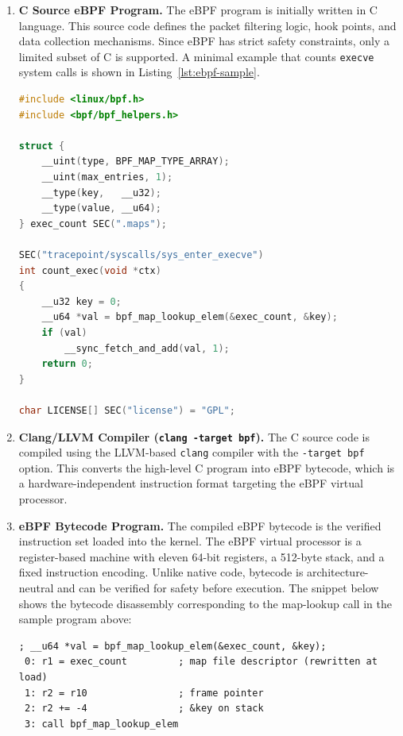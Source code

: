 \documentclass{mnitjaipur}
\begin{document}
\begin{enumerate}

\item \textbf{C Source eBPF Program.}
The eBPF program is initially written in C language. This source code defines the packet filtering logic, hook points, and data collection mechanisms. Since eBPF has strict safety constraints, only a limited subset of C is supported. A minimal example that counts \texttt{execve} system calls is shown in Listing~\ref{lst:ebpf-sample}.

\begin{lstlisting}[language=C,caption={Minimal eBPF C program: counting execve calls},label={lst:ebpf-sample}]
#include <linux/bpf.h>
#include <bpf/bpf_helpers.h>

struct {
    __uint(type, BPF_MAP_TYPE_ARRAY);
    __uint(max_entries, 1);
    __type(key,   __u32);
    __type(value, __u64);
} exec_count SEC(".maps");

SEC("tracepoint/syscalls/sys_enter_execve")
int count_exec(void *ctx)
{
    __u32 key = 0;
    __u64 *val = bpf_map_lookup_elem(&exec_count, &key);
    if (val)
        __sync_fetch_and_add(val, 1);
    return 0;
}

char LICENSE[] SEC("license") = "GPL";
\end{lstlisting}

\item \textbf{Clang/LLVM Compiler (\texttt{clang -target bpf}).}
The C source code is compiled using the LLVM-based \texttt{clang} compiler with the \texttt{-target bpf} option. This converts the high-level C program into eBPF bytecode, which is a hardware-independent instruction format targeting the eBPF virtual processor.

\item \textbf{eBPF Bytecode Program.}
The compiled eBPF bytecode is the verified instruction set loaded into the kernel. The eBPF virtual processor is a register-based machine with eleven 64-bit registers, a 512-byte stack, and a fixed instruction encoding. Unlike native code, bytecode is architecture-neutral and can be verified for safety before execution. The snippet below shows the bytecode disassembly corresponding to the map-lookup call in the sample program above:

\begin{lstlisting}[language={}]
; __u64 *val = bpf_map_lookup_elem(&exec_count, &key);
 0: r1 = exec_count         ; map file descriptor (rewritten at load)
 1: r2 = r10                ; frame pointer
 2: r2 += -4                ; &key on stack
 3: call bpf_map_lookup_elem
\end{lstlisting}


\end{enumerate}
\end{document}
